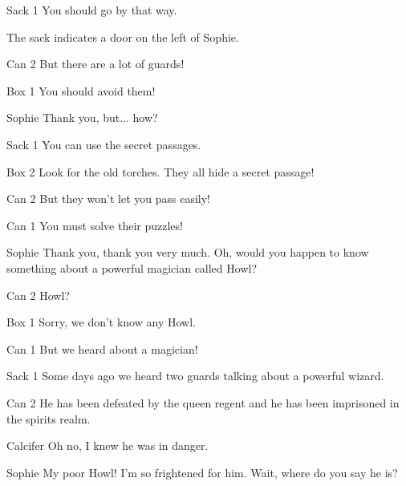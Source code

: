 \begin{screenplay}
\begin{dialogue}{Sack 1}
You should go by that way.
\end{dialogue}
The sack indicates a door on the left of Sophie.
\begin{dialogue}{Can 2}
But there are a lot of guards!
\end{dialogue}
\begin{dialogue}{Box 1}
You should avoid them!
\end{dialogue}
\begin{dialogue}{Sophie}
Thank you, but... how?
\end{dialogue}
\begin{dialogue}{Sack 1}
You can use the secret passages.
\end{dialogue}
\begin{dialogue}{Box 2}
Look for the old torches. They all hide a secret passage!
\end{dialogue}
\begin{dialogue}{Can 2}
But they won't let you pass easily!
\end{dialogue}
\begin{dialogue}{Can 1}
You must solve their puzzles!
\end{dialogue}
\begin{dialogue}[grateful]{Sophie}
Thank you, thank you very much. Oh, would you happen to know something about a powerful magician called Howl?
\end{dialogue}
\begin{dialogue}{Can 2}
Howl?
\end{dialogue}
\begin{dialogue}{Box 1}
Sorry, we don’t know any Howl.
\end{dialogue}
\begin{dialogue}{Can 1}
But we heard about a magician!
\end{dialogue}
\begin{dialogue}{Sack 1}
Some days ago we heard two guards talking about a powerful wizard.
\end{dialogue}
\begin{dialogue}{Can 2}
He has been defeated by the queen regent and he has been imprisoned in the spirits realm.
\end{dialogue}
\begin{dialogue}{Calcifer}
Oh no, I knew he was in danger.
\end{dialogue}
\begin{dialogue}{Sophie}
My poor Howl! I’m so frightened for him. Wait, where do you say he is?
\end{dialogue}

\end{screenplay}
